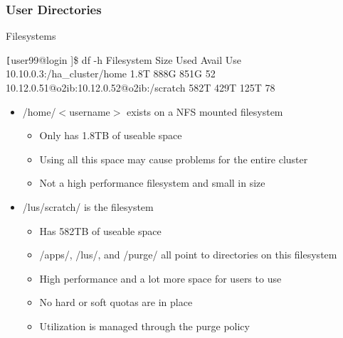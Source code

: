 \begin{frame}[fragile]
\frametitle{User Directories}
\begin{block}{Filesystems}
\begin{semiverbatim}\tiny \texttt
[user99@login \ctilde]\$ df -h
Filesystem                                  Size  Used Avail Use%
10.10.0.3:/ha_cluster/home                  1.8T  888G  851G  52%
10.12.0.51@o2ib:10.12.0.52@o2ib:/scratch    582T  429T  125T  78%
\end{semiverbatim}
\end{block}
	\begin{itemize}\footnotesize
		\item /home/$<$username$>$ exists on a NFS mounted filesystem
		\begin{itemize}\tiny
			\item Only has 1.8TB of useable space
			\item Using all this space may cause problems for the entire cluster
			\item Not a high performance filesystem and small in size
		\end{itemize}
		\item /lus/scratch/ is the {\lustre} filesystem
		\begin{itemize}\tiny
			\item Has 582TB of useable space
			\item \ctilde{}/apps/, \ctilde{}/lus/, and \ctilde{}/purge/ all point to directories on this filesystem
			\item High performance and a lot more space for users to use
			\item No hard or soft quotas are in place
			\item Utilization is managed through the  purge policy
		\end{itemize}
	\end{itemize}
\end{frame}


